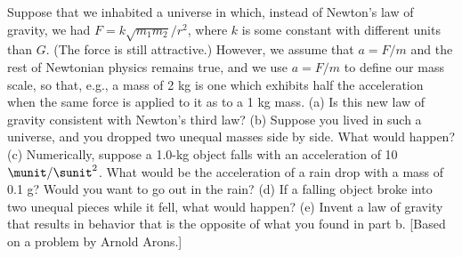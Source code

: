  Suppose that we inhabited a universe in which, instead
of Newton's law of gravity, we had $F=k\sqrt{m_1m_2}/r^2$, where $k$ is some
constant with different units than $G$. (The force is still
attractive.) However, we assume that $a=F/m$ and the rest of
Newtonian physics remains true, and we use $a=F/m$ to define
our mass scale, so that, e.g., a mass of 2 kg is one which
exhibits half the acceleration when the same force is
applied to it as to a 1 kg mass.\hwendpart
 (a) Is this new law of
gravity consistent with Newton's third law?\hwendpart
 (b) Suppose you
lived in such a universe, and you dropped two unequal masses
side by side. What would happen?\hwendpart
 (c) Numerically, suppose a
1.0-kg object falls with an acceleration of 10 $\munit/\sunit^2$. What
would be the acceleration of a rain drop with a mass of 0.1
g? Would you want to go out in the rain?\hwendpart
 (d) If a falling
object broke into two unequal pieces while it fell, what
would happen?\hwendpart
 (e) Invent a law of gravity that results in
behavior that is the opposite of what you found in part b.
[Based on a problem by Arnold Arons.]
